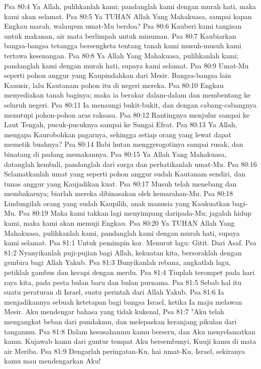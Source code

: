Psa 80:4  Ya Allah, pulihkanlah kami; pandanglah kami dengan murah hati, maka kami akan selamat.
Psa 80:5  Ya TUHAN Allah Yang Mahakuasa, sampai kapan Engkau marah, walaupun umat-Mu berdoa?
Psa 80:6  Kauberi kami tangisan untuk makanan, air mata berlimpah untuk minuman.
Psa 80:7  Kaubiarkan bangsa-bangsa tetangga bersengketa tentang tanah kami musuh-musuh kami tertawa kesenangan.
Psa 80:8  Ya Allah Yang Mahakuasa, pulihkanlah kami; pandanglah kami dengan murah hati, supaya kami selamat.
Psa 80:9  Umat-Mu seperti pohon anggur yang Kaupindahkan dari Mesir. Bangsa-bangsa lain Kauusir, lalu Kautanam pohon itu di negeri mereka.
Psa 80:10  Engkau menyediakan tanah baginya; maka ia berakar dalam-dalam dan membentang ke seluruh negeri.
Psa 80:11  Ia menaungi bukit-bukit, dan dengan cabang-cabangnya menutupi pohon-pohon aras raksasa.
Psa 80:12  Rantingnya menjulur sampai ke Laut Tengah, pucuk-pucuknya sampai ke Sungai Efrat.
Psa 80:13  Ya Allah, mengapa Kaurobohkan pagarnya, sehingga setiap orang yang lewat dapat memetik buahnya?
Psa 80:14  Babi hutan menggerogotinya sampai rusak, dan binatang di padang memakannya.
Psa 80:15  Ya Allah Yang Mahakuasa, datanglah kembali, pandanglah dari surga dan perhatikanlah umat-Mu.
Psa 80:16  Selamatkanlah umat yang seperti pohon anggur sudah Kautanam sendiri, dan tunas anggur yang Kaujadikan kuat.
Psa 80:17  Musuh telah menebang dan membakarnya; biarlah mereka dibinasakan oleh kemarahan-Mu.
Psa 80:18  Lindungilah orang yang sudah Kaupilih, anak manusia yang Kaukuatkan bagi-Mu.
Psa 80:19  Maka kami takkan lagi menyimpang daripada-Mu; jagalah hidup kami, maka kami akan memuji Engkau.
Psa 80:20  Ya TUHAN Allah Yang Mahakuasa, pulihkanlah kami, pandanglah kami dengan murah hati, supaya kami selamat.
Psa 81:1  Untuk pemimpin kor. Menurut lagu: Gitit. Dari Asaf.
Psa 81:2  Nyanyikanlah puji-pujian bagi Allah, kekuatan kita, bersoraklah dengan gembira bagi Allah Yakub.
Psa 81:3  Bunyikanlah rebana, angkatlah lagu, petiklah gambus dan kecapi dengan merdu.
Psa 81:4  Tiuplah terompet pada hari raya kita, pada pesta bulan baru dan bulan purnama.
Psa 81:5  Sebab hal itu suatu peraturan di Israel, suatu perintah dari Allah Yakub.
Psa 81:6  Ia menjadikannya sebuah ketetapan bagi bangsa Israel, ketika Ia maju melawan Mesir. Aku mendengar bahasa yang tidak kukenal,
Psa 81:7  "Aku telah mengangkat beban dari pundakmu, dan melepaskan keranjang pikulan dari tanganmu.
Psa 81:8  Dalam kesusahanmu kamu berseru, dan Aku menyelamatkan kamu. Kujawab kamu dari guntur tempat Aku bersembunyi, Kuuji kamu di mata air Meriba.
Psa 81:9  Dengarlah peringatan-Ku, hai umat-Ku, Israel, sekiranya kamu mau mendengarkan Aku!
